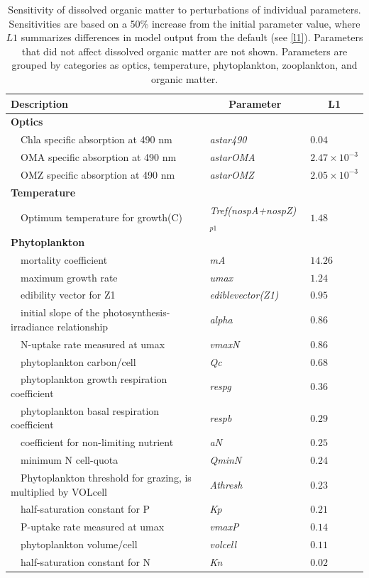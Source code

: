 \documentclass[letterpaper,12pt,oneside]{article}\usepackage[]{graphicx}\usepackage[]{color}
\begin{document}
\begin{table}[!tbp]
{\footnotesize
\caption{Sensitivity of dissolved organic matter to perturbations of individual parameters.  Sensitivities are based on a 50\% increase from the initial parameter value, where $L1$ summarizes differences in model output from the default (see \cref{l1}).  Parameters that did not affect dissolved organic matter are not shown.  Parameters are grouped by categories as optics, temperature, phytoplankton, zooplankton, and organic matter.\label{tab:om2sens}} 
\begin{center}
\begin{tabular}{lll}
\hline\hline
\multicolumn{1}{l}{Description}&\multicolumn{1}{c}{Parameter}&\multicolumn{1}{c}{L1}\tabularnewline
\hline
{\bfseries Optics}&&\tabularnewline
~~Chla specific absorption at 490 nm&\textit{astar490}&$0.04$\tabularnewline
~~OMA specific absorption at 490 nm&\textit{astarOMA}&$2.47\times 10^{-3}$\tabularnewline
~~OMZ specific absorption at 490 nm&\textit{astarOMZ}&$2.05\times 10^{-3}$\tabularnewline
\hline
{\bfseries Temperature}&&\tabularnewline
~~Optimum temperature for growth(C)&\textit{Tref(nospA+nospZ)$_{p1}$}&$1.48$\tabularnewline
\hline
{\bfseries Phytoplankton}&&\tabularnewline
~~mortality coefficient&\textit{mA}&$14.26$\tabularnewline
~~maximum growth rate&\textit{umax}&$1.24$\tabularnewline
~~edibility vector for Z1&\textit{ediblevector(Z1)}&$0.95$\tabularnewline
~~initial slope of the photosynthesis-irradiance relationship&\textit{alpha}&$0.86$\tabularnewline
~~N-uptake rate measured at umax&\textit{vmaxN}&$0.86$\tabularnewline
~~phytoplankton carbon/cell&\textit{Qc}&$0.68$\tabularnewline
~~phytoplankton growth respiration coefficient&\textit{respg}&$0.36$\tabularnewline
~~phytoplankton basal respiration coefficient&\textit{respb}&$0.29$\tabularnewline
~~coefficient for non-limiting nutrient&\textit{aN}&$0.25$\tabularnewline
~~minimum N cell-quota&\textit{QminN}&$0.24$\tabularnewline
~~Phytoplankton threshold for grazing, is multiplied by VOLcell&\textit{Athresh}&$0.23$\tabularnewline
~~half-saturation constant for P&\textit{Kp}&$0.21$\tabularnewline
~~P-uptake rate measured at umax&\textit{vmaxP}&$0.14$\tabularnewline
~~phytoplankton volume/cell&\textit{volcell}&$0.11$\tabularnewline
~~half-saturation constant for N&\textit{Kn}&$0.02$\tabularnewline

\end{tabular}
\end{center}}
\end{table}
\end{document}
